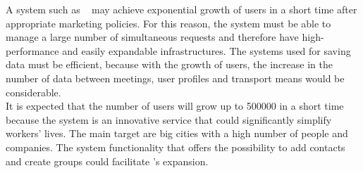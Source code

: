 A system such as \projectname~ may achieve exponential growth of users in a short time after appropriate marketing policies. For this reason, the system must be able to manage a large number of simultaneous requests and therefore have high-performance and easily expandable infrastructures. The systems used for saving data must be efficient, because with the growth of users, the increase in the number of data between meetings, user profiles and transport means would be considerable.\\
It is expected that the number of users will grow up to 500000 in a short time because the system is an innovative service that could significantly simplify workers' lives. The main target are big cities with a high number of people and companies. The system functionality that offers the possibility to add contacts and create groups could facilitate \projectname's expansion.